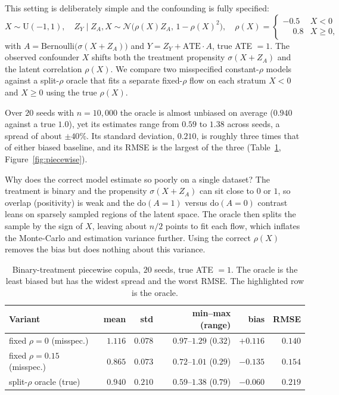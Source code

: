 \documentclass[11pt]{article}
\newcommand{\doop}{\mathrm{do}}
\newcommand{\N}{\mathcal{N}}
\begin{document}
This setting is deliberately simple and the confounding is fully specified:
\begin{equation*}
  X\sim\mathrm{U}(-1,1),\quad
  Z_Y\mid Z_A,X \sim \N\!\big(\rho(X)Z_A,\,1-\rho(X)^2\big),\quad
  \rho(X)=\begin{cases}-0.5 & X<0\\ \phantom{-}0.8 & X\ge0,\end{cases}
\end{equation*}
with $A=\mathrm{Bernoulli}\big(\sigma(X+Z_A)\big)$ and $Y=Z_Y+\mathrm{ATE}\cdot A$,
true ATE $=1$. The observed confounder $X$ shifts both the treatment propensity
$\sigma(X+Z_A)$ and the latent correlation $\rho(X)$. We compare two misspecified
constant-$\rho$ models against a split-$\rho$ oracle that fits a separate fixed-$\rho$
flow on each stratum $X<0$ and $X\ge0$ using the true $\rho(X)$.

Over $20$ seeds with $n=10{,}000$ the oracle is almost unbiased on average
($0.940$ against a true $1.0$), yet its estimates range from $0.59$ to $1.38$
across seeds, a spread of about $\pm40\%$. Its standard deviation, $0.210$, is
roughly three times that of either biased baseline, and its RMSE is the largest of
the three (Table~\ref{tab:piecewise}, Figure~\ref{fig:piecewise}).

Why does the correct model estimate so poorly on a single dataset? The treatment is
binary and the propensity $\sigma(X+Z_A)$ can sit close to $0$ or $1$, so overlap
(positivity) is weak and the $\doop(A=1)$ versus $\doop(A=0)$ contrast leans on
sparsely sampled regions of the latent space. The oracle then splits the sample by
the sign of $X$, leaving about $n/2$ points to fit each flow, which inflates the
Monte-Carlo and estimation variance further. Using the correct $\rho(X)$ removes the
bias but does nothing about this variance.

\begin{table}[t]
\centering
\small
\caption{Binary-treatment piecewise copula, $20$ seeds, true ATE $=1$. The oracle
is the least biased but has the widest spread and the worst RMSE. The highlighted
row is the oracle.}
\label{tab:piecewise}
\begin{tabular}{@{}lrrrrr@{}}
\toprule
Variant & mean & std & min--max (range) & bias & RMSE \\
\midrule
fixed $\rho=0$ (misspec.)    & $1.116$ & $0.078$ & $0.97$--$1.29$ ($0.32$) & $+0.116$ & $0.140$ \\
fixed $\rho=0.15$ (misspec.) & $0.865$ & $0.073$ & $0.72$--$1.01$ ($0.29$) & $-0.135$ & $0.154$ \\
\rowcolor{gray!15}
split-$\rho$ oracle (true)   & $0.940$ & $0.210$ & $0.59$--$1.38$ ($0.79$) & $-0.060$ & $0.219$ \\
\bottomrule
\end{tabular}
\end{table}
\end{document}
